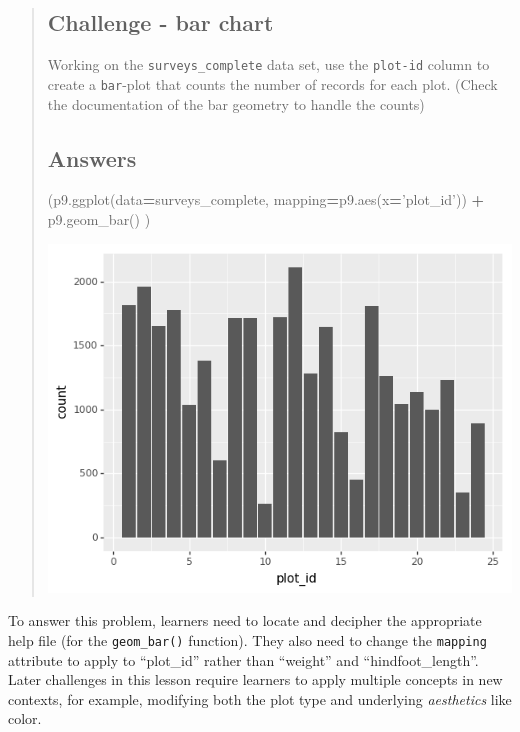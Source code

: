 \documentclass[]{book}
\newenvironment{Shaded}{\begin{snugshade}}{\end{snugshade}}
\newcommand{\NormalTok}[1]{#1}
\newcommand{\OperatorTok}[1]{\textcolor[rgb]{0.81,0.36,0.00}{\textbf{#1}}}
\newcommand{\StringTok}[1]{\textcolor[rgb]{0.31,0.60,0.02}{#1}}
\begin{document}
\begin{quote}
\hypertarget{challenge---bar-chart}{%
\subsection*{Challenge - bar chart}\label{challenge---bar-chart}}

Working on the \texttt{surveys\_complete} data set, use the \texttt{plot-id} column to
create a \texttt{bar}-plot that counts the number of records for each plot. (Check
the documentation of the bar geometry to handle the counts)

\hypertarget{answers}{%
\subsection*{Answers}\label{answers}}

\begin{Shaded}
\begin{Highlighting}[]
\NormalTok{(p9.ggplot(data}\OperatorTok{=}\NormalTok{surveys_complete,}
\NormalTok{           mapping}\OperatorTok{=}\NormalTok{p9.aes(x}\OperatorTok{=}\StringTok{'plot_id'}\NormalTok{))}
    \OperatorTok{+}\NormalTok{ p9.geom_bar()}
\NormalTok{)}
\end{Highlighting}
\end{Shaded}

\includegraphics{./figures/python_barplot_example.png}
\end{quote}

To answer this problem, learners need to locate and decipher the appropriate help file (for
the \texttt{geom\_bar()} function). They also need to change the \texttt{mapping} attribute to apply to ``plot\_id'' rather than ``weight'' and ``hindfoot\_length''. Later challenges in this lesson require
learners to apply multiple concepts in new contexts, for example, modifying both the plot type
and underlying \emph{aesthetics} like color.
\end{document}
